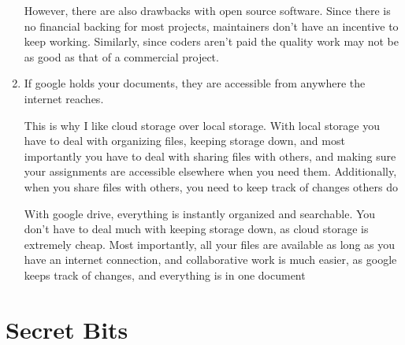 \documentclass{scrartcl}
\begin{document}
\begin{enumerate}
However, there are also drawbacks with open source software. Since there is
no financial backing for most projects, maintainers don't have an incentive
to keep working. Similarly, since coders aren't paid the quality work may not
be as good as that of a commercial project.

\item If google holds your documents, they are accessible from anywhere the
internet reaches.

This is why I like cloud storage over local storage. With local storage you
have to deal with organizing files, keeping storage down, and most
importantly you have to deal with sharing files with others, and making sure
your assignments are accessible elsewhere when you need them. Additionally,
when you share files with others, you need to keep track of changes others do

With google drive, everything is instantly organized and searchable. You
don't have to deal much with keeping storage down, as cloud storage is
extremely cheap. Most importantly, all your files are available as long as
you have an internet connection, and collaborative work is much easier, as
google keeps track of changes, and everything is in one document
\end{enumerate}

\section{Secret Bits}
\label{sec:orgc5c364a}
\end{document}
